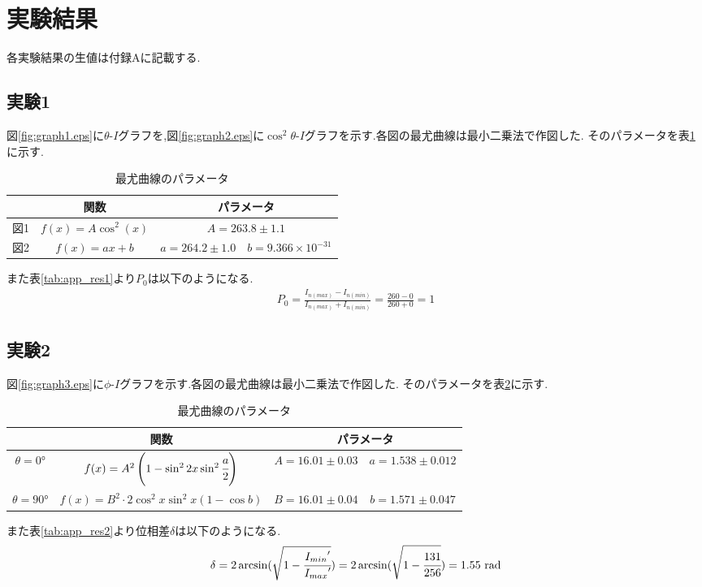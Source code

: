 \section{実験結果}
各実験結果の生値は付録Aに記載する.
\subsection{実験1}
図\ref{fig:graph1.eps}に$\theta$-$I$グラフを,図\ref{fig:graph2.eps}に$\cos^2\theta$-$I$グラフを示す.各図の最尤曲線は最小二乗法で作図した.
そのパラメータを表\ref{tab:res1_saiyu}に示す.
\begin{table}[h]
   \caption{最尤曲線のパラメータ}
   \label{tab:res1_saiyu}
   \centering
   \begin{tabular}{cccc}
     \hline
     &関数&\multicolumn{2}{c}{パラメータ}\\
     \hline \hline
     図1&$f(x)=A\cos^2(x)$&\multicolumn{2}{c}{$A=263.8\pm1.1$}\\
     図2&$f(x)=ax+b$&$a=264.2\pm1.0$&$b=9.366\times10^{-31}$\\
     \hline
   \end{tabular}
\end{table}
また表\ref{tab:app_res1}より$P_0$は以下のようになる.
\begin{align}
  \label{equ:res1}
  P_0=\frac{I_{n(max)}-I_{n(min)}}{I_{n(max)}+I_{n(min)}}=\frac{260-0}{260+0}=1
\end{align}
\subsection{実験2}
図\ref{fig:graph3.eps}に$\phi$-$I$グラフを示す.各図の最尤曲線は最小二乗法で作図した.
そのパラメータを表\ref{tab:res2_saiyu}に示す.
\begin{table}[h]
   \caption{最尤曲線のパラメータ}
   \label{tab:res2_saiyu}
   \centering
   \begin{tabular}{cccc}
     \hline
     &関数&\multicolumn{2}{c}{パラメータ}\\
     \hline \hline
     $\theta=0\si{\degree}$&$f(x)=A^2\left(1-\sin^2 2x\sin^2 \cfrac{a}{2}\right)$&$A=16.01\pm0.03$&$a=1.538\pm0.012$\\
     $\theta=90\si{\degree}$&$f(x)=B^2\cdot2\cos^2x\sin^2x\left(1-\cos b\right)$&$B=16.01\pm0.04$&$b=1.571\pm0.047$\\
     \hline
   \end{tabular}
\end{table}
また表\ref{tab:app_res2}より位相差$\delta$は以下のようになる.
\begin{align}
  \label{equ:res2}
  \delta=2\arcsin(\sqrt{1-\cfrac{{I_{min}}'}{{I_{max}}'}})=2\arcsin(\sqrt{1-\cfrac{131}{256}})=1.55~\si{\radian}
\end{align}
